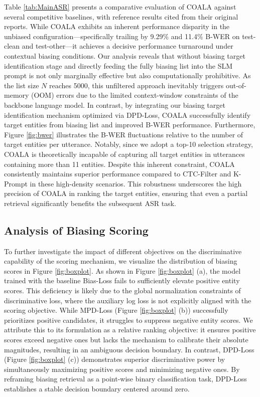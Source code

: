 \documentclass[cameraready]{Interspeech}
\begin{document}
Table \ref{tab:MainASR} presents a comparative evaluation of COALA against several competitive baselines, with reference results cited from their original reports.
%
While COALA exhibits an inherent performance disparity in the unbiased configuration—specifically trailing by 9.29\% and 11.4\% B-WER on test-clean and test-other—it achieves a decisive performance turnaround under contextual biasing conditions.
%
Our analysis reveals that without biasing target identification stage and directly feeding the fully biasing list into the SLM prompt is not only marginally effective but also computationally prohibitive.
%
As the list size $N$ reaches 5000, this unfiltered approach inevitably triggers out-of-memory (OOM) errors due to the limited context-window constraints of the backbone language model.
%
In contrast, by integrating our biasing target identification mechanism optimized via DPD-Loss, COALA successfully identify target entities from biasing list and improved B-WER performance.
%
Furthermore, Figure \ref{fig:bwer} illustrates the B-WER fluctuations relative to the number of target entities per utterance.
%
Notably, since we adopt a top-10 selection strategy, COALA is theoretically incapable of capturing all target entities in utterances containing more than 11 entities.
%
Despite this inherent constraint, COALA consistently maintains superior performance compared to CTC-Filter and K-Prompt in these high-density scenarios.
%
This robustness underscores the high precision of COALA in ranking the target entities, ensuring that even a partial retrieval significantly benefits the subsequent ASR task.


\subsection{Analysis of Biasing Scoring}

To further investigate the impact of different objectives on the discriminative capability of the scoring mechanism, we visualize the distribution of biasing scores in Figure \ref{fig:boxplot}.
%
As shown in Figure \ref{fig:boxplot} (a), the model trained with the baseline Bias-Loss fails to sufficiently elevate positive entity scores.
%
This deficiency is likely due to the global normalization constraints of discriminative loss, where the auxiliary log loss is not explicitly aligned with the scoring objective.
%
While MPD-Loss (Figure \ref{fig:boxplot} (b)) successfully prioritizes positive candidates, it struggles to suppress negative entity scores.
%
We attribute this to its formulation as a relative ranking objective: it ensures positive scores exceed negative ones but lacks the mechanism to calibrate their absolute magnitudes, resulting in an ambiguous decision boundary.
%
In contrast, DPD-Loss (Figure \ref{fig:boxplot} (c)) demonstrates superior discriminative power by simultaneously maximizing positive scores and minimizing negative ones.
%
By reframing biasing retrieval as a point-wise binary classification task, DPD-Loss establishes a stable decision boundary centered around zero.
\end{document}
